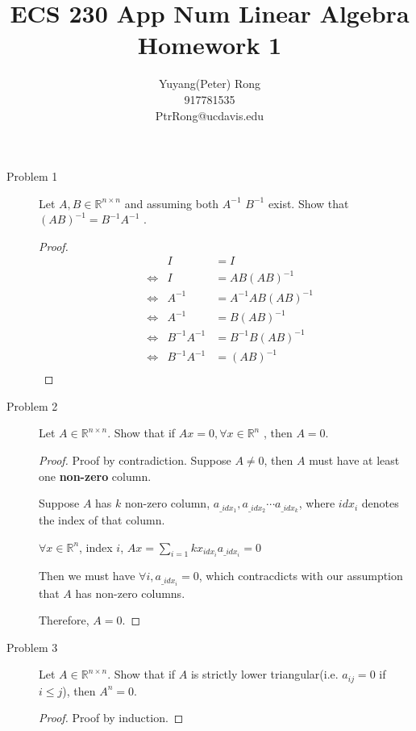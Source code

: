 \documentclass{article}
\title{ECS 230 App Num Linear Algebra \\ Homework 1}
\author{Yuyang(Peter) Rong \\917781535 \\ PtrRong@ucdavis.edu}
\begin{document}
\maketitle

\begin{description}


	\item[Problem 1] Let $A, B \in \mathbb{R}^{n\times n}$ and assuming both $A^{-1}$ $B^{-1}$ exist. Show that $(AB)^{-1} =
		      B^{-1} A^{-1}$ .
	      \begin{proof}
		      \begin{align*}
			       &                 & I            & =  I                 \\
			       & \Leftrightarrow & I            & =  AB(AB)^{-1}       \\
			       & \Leftrightarrow & A^{-1}       & =  A^{-1}AB(AB)^{-1} \\
			       & \Leftrightarrow & A^{-1}       & =  B(AB)^{-1}        \\
			       & \Leftrightarrow & B^{-1}A^{-1} & =  B^{-1}B(AB)^{-1}  \\
			       & \Leftrightarrow & B^{-1}A^{-1} & =  (AB)^{-1}         \\
		      \end{align*}
	      \end{proof}


	\item[Problem 2] Let $A \in \mathbb{R}^{n\times n}$. Show that if $Ax = 0,  \forall x \in \mathbb{R}^n$ , then $A = 0$.
	      \begin{proof}
		      Proof by contradiction. Suppose $A \ne 0$, then $A$ must have at least one \textbf{non-zero} column.

		      Suppose $A$ has $k$ non-zero column, $a_{\_idx_1}, a_{\_idx_2} \cdots a_{\_idx_k}$, where $idx_i$ denotes the index of that column.

		      $\forall x \in \mathbb{R}^n$, index $i$, $Ax = \sum_{i = 1}{k}x_{idx_i}a_{\_idx_i}=0$

		      Then we must have $\forall i, a_{\_idx_i} = 0$, which contracdicts with our assumption that $A$ has non-zero columns.

		      Therefore, $A = 0$.
	      \end{proof}


	\item[Problem 3] Let $A \in \mathbb{R}^{n\times n}$. Show that if $A$ is strictly lower triangular(i.e. $a_{ij} = 0$ if $i \le j$), then $A^n=0$.
	      \begin{proof}
		      Proof by induction.


\end{proof}
\end{description}
\end{document}
